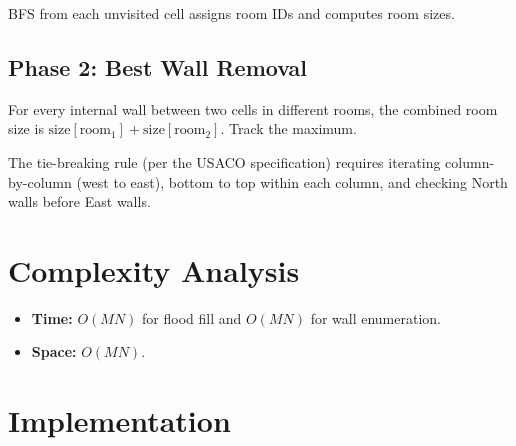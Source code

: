 \documentclass[11pt,a4paper]{article}
\begin{document}
BFS from each unvisited cell assigns room IDs and computes room sizes.

\subsection{Phase 2: Best Wall Removal}

For every internal wall between two cells in different rooms, the combined
room size is $\text{size}[\text{room}_1] + \text{size}[\text{room}_2]$.
Track the maximum.

The tie-breaking rule (per the USACO specification) requires iterating
column-by-column (west to east), bottom to top within each column, and
checking North walls before East walls.

\section{Complexity Analysis}

\begin{itemize}
  \item \textbf{Time:} $O(MN)$ for flood fill and $O(MN)$ for wall
    enumeration.
  \item \textbf{Space:} $O(MN)$.
\end{itemize}

\section{Implementation}
\end{document}
